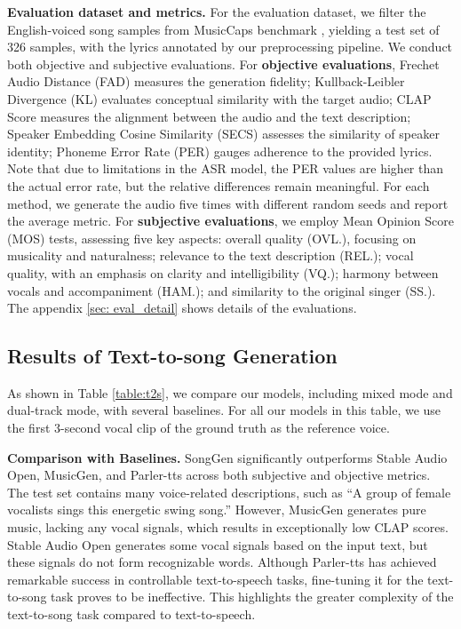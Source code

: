 \noindent\textbf{Evaluation dataset and metrics.}
For the evaluation dataset, we filter the English-voiced song samples from MusicCaps benchmark \cite{agostinelli2023musiclm}, yielding a test set of 326 samples, with the lyrics annotated by our preprocessing pipeline. 
We conduct both objective and subjective evaluations.
For \textbf{objective evaluations}, Frechet Audio Distance (FAD) measures the generation fidelity; Kullback-Leibler Divergence (KL) evaluates conceptual similarity with the target audio; CLAP Score measures the alignment between the audio and the text description; Speaker Embedding Cosine Similarity (SECS) assesses the similarity of speaker identity; Phoneme Error Rate (PER) gauges adherence to the provided lyrics. Note that due to limitations in the ASR model, the PER values are higher than the actual error rate, but the relative differences remain meaningful.
For each method, we generate the audio five times with different random seeds and report the average metric.
For \textbf{subjective evaluations}, we employ Mean Opinion Score (MOS) tests, assessing five key aspects: overall quality (OVL.), focusing on musicality and naturalness; relevance to the text description (REL.); vocal quality, with an emphasis on clarity and intelligibility (VQ.); harmony between vocals and accompaniment (HAM.); and similarity to the original singer (SS.).
The appendix \ref{sec: eval_detail} shows details of the evaluations.

\subsection{Results of Text-to-song Generation}
As shown in Table \ref{table:t2s}, we compare our models, including mixed mode and dual-track mode, with several baselines. For all our models in this table, we use the first 3-second vocal clip of the ground truth as the reference voice.

\noindent\textbf{Comparison with Baselines.}
SongGen significantly outperforms Stable Audio Open, MusicGen, and Parler-tts across both subjective and objective metrics. 
The test set contains many voice-related descriptions, such as “A group of female vocalists sings this energetic swing song.” However, MusicGen generates pure music, lacking any vocal signals, which results in exceptionally low CLAP scores. Stable Audio Open generates some vocal signals based on the input text, but these signals do not form recognizable words.
Although Parler-tts has achieved remarkable success in controllable text-to-speech tasks, fine-tuning it for the text-to-song task proves to be ineffective. This highlights the greater complexity of the text-to-song task compared to text-to-speech.

